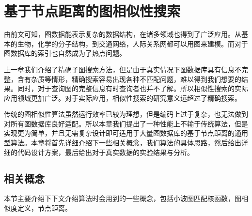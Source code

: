 \documentclass{XDBAthesis}
\begin{document}
\else
\fi
\chapter{基于节点距离的图相似性搜索}
\label{chap:gHash}
由前文可知，图数据能表示复杂的数据结构，在诸多领域也得到了广泛应用。从基本的生物，化学的分子结构，到交通网络，人际关系网都可以用图来建模。而对于图数据库的索引也自然成为了热点问题。

上一章我们介绍了精确子图搜索方法，但是由于真实情况下图数据库具有信息不完整，含有杂质等情形，精确搜索容易出现各种不匹配问题，难以得到我们想要的结果。同时，对于查询图的完整信息有时查询者也并不了解。所以相似性搜索的实际应用领域更加广泛。对于实际应用，相似性搜索的研究意义远超过了精确搜索。

传统的图相似性算法虽然运行效率已较为理想，但是编码上过于复杂，也无法做到对所有图数据库良好适配。所以本章我们提出了一种性能上不输于传统算法，但是实现更为简单，并且无需复杂设计即可适用于大量图数据库的基于节点距离的通用型算法。本章将首先详细介绍下一些相关概念，我们算法的具体思路，然后给出详细的代码设计方案，最后给出对于真实数据的实验结果与分析。
\section{相关概念}
本节主要介绍下下文介绍算法时会用到的一些概念，包括小波图匹配核函数，图相似度定义，节点距离。
\end{document}
